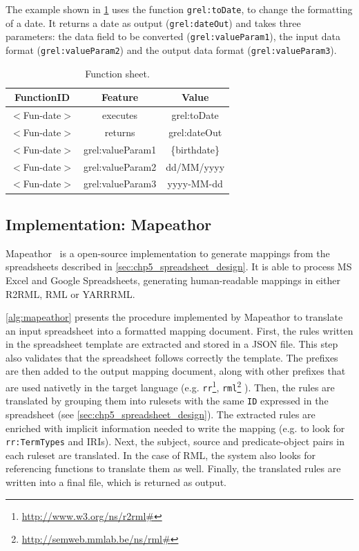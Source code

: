 The example shown in \cref{tab:chp5-1_function_sheet} uses the function \texttt{grel:toDate}, to change the formatting of a date. It returns a date as output (\texttt{grel:dateOut}) and takes three parameters: the data field to be converted (\texttt{grel:valueParam1}), the input data format (\texttt{grel:valueParam2}) and the output data format (\texttt{grel:valueParam3}).

\begin{table}[h!]
\caption{Function sheet.}
\label{tab:chp5-1_function_sheet}
\centering
\begin{tabular}{c|c|c}
\midrule
\textbf{FunctionID} & \textbf{Feature} & \textbf{Value} \\ \midrule
$<$Fun-date$>$ & executes & grel:toDate \\  
$<$Fun-date$>$ & returns & grel:dateOut \\  
$<$Fun-date$>$ & grel:valueParam1 & \{birthdate\} \\
$<$Fun-date$>$ & grel:valueParam2 & dd/MM/yyyy \\
$<$Fun-date$>$ & grel:valueParam3 & yyyy-MM-dd \\
\midrule
\end{tabular}
\end{table}


\subsection{Implementation: Mapeathor}
\label{sec:chp5_mapeathor_tool}

Mapeathor~\citep{iglesias-molina_2023_5973906} is a open-source implementation to generate mappings from the spreadsheets described in \cref{sec:chp5_spreadsheet_design}. It is able to process MS Excel and Google Spreadsheets, generating human-readable mappings in either R2RML, RML or YARRRML. 

\cref{alg:mapeathor} presents the procedure implemented by Mapeathor to translate an input spreadsheet into a formatted mapping document. First, the rules written in the spreadsheet template are extracted and stored in a JSON file. This step also validates that the spreadsheet follows correctly the template. The prefixes are then added to the output mapping document, along with other prefixes that are used nativetly in the target language (e.g. \texttt{rr}\footnote{\url{http://www.w3.org/ns/r2rml\#}}, \texttt{rml}\footnote{\url{http://semweb.mmlab.be/ns/rml\#}} ). Then, the rules are translated by grouping them into rulesets with the same \texttt{ID} expressed in the spreadsheet (see \cref{sec:chp5_spreadsheet_design}). The extracted rules are enriched with implicit information needed to write the mapping (e.g. to look for \texttt{rr:TermTypes} and IRIs). Next, the subject, source and predicate-object pairs in each ruleset are translated. In the case of RML, the system also looks for referencing functions to translate them as well. Finally, the translated rules are written into a final file, which is returned as output. 



